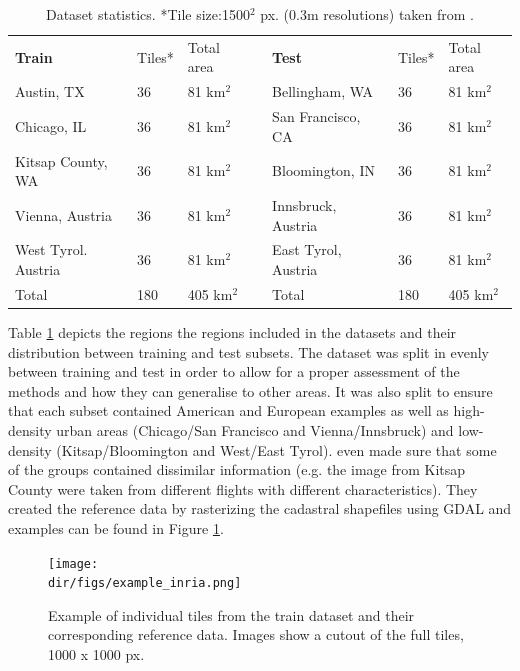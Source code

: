 \begin{table}[htpb]
\centering
\begin{adjustbox}{width=1\textwidth,center=\textwidth}
\begin{tabular}{l|llll|ll}
\textbf{Train}      & Tiles* & Total area &  & \textbf{Test}       & Tiles* & Total area \\ \cline{1-3} \cline{5-7} 
Austin, TX          & 36     & 81 km$^2$     &  & Bellingham, WA      & 36     & 81 km$^2$     \\
Chicago, IL         & 36     & 81 km$^2$     &  & San Francisco, CA   & 36     & 81 km$^2$     \\
Kitsap County, WA   & 36     & 81 km$^2$     &  & Bloomington, IN     & 36     & 81 km$^2$     \\
Vienna, Austria     & 36     & 81 km$^2$     &  & Innsbruck, Austria  & 36     & 81 km$^2$     \\
West Tyrol. Austria & 36     & 81 km$^2$     &  & East Tyrol, Austria & 36     & 81 km$^2$     \\
Total               & 180    & 405 km$^2$    &  & Total               & 180    & 405 km$^2$   
\end{tabular}
\end{adjustbox}
\caption[Dataset statistics.]{Dataset statistics. *Tile size:1500$^2$ px. (0.3m resolutions) taken from \cite{maggiori17a}.}
\label{tab.inria_dataset}
\end{table}

Table \ref{tab.inria_dataset} depicts the regions the regions included in the datasets and their distribution between training and test subsets. The dataset was split in evenly between training and test in order to allow for a proper assessment of the methods and how they can generalise to other areas. It was also split to ensure that each subset contained American and European examples as well as high-density urban areas (Chicago/San Francisco and Vienna/Innsbruck) and low-density (Kitsap/Bloomington and West/East Tyrol). \cite{maggiori17a} even made sure that some of the groups contained dissimilar information (e.g. the image from Kitsap County were taken from different flights with different characteristics). They created the reference data by rasterizing the cadastral shapefiles using GDAL and examples can be found in Figure \ref{fig.inria_dataset}.

\begin{figure}[htpb]
    \centering
    \texttt{[image: \\dir/figs/example\_inria.png]}
    \caption[Examples from the INRIA Image Labelling Dataset]{Example of individual tiles from the train dataset and their corresponding reference data. Images show a cutout of the full tiles, 1000 x 1000 px.}
    \label{fig.inria_dataset}
\end{figure}

